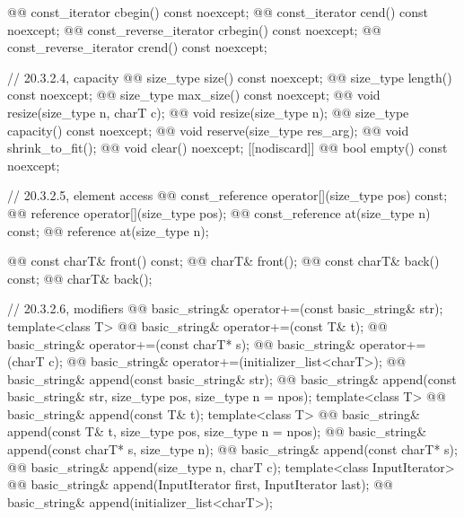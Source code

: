 \documentclass{wg21}
\begin{document}
\begin{codeblock}
{{    @@ const_iterator         cbegin() const noexcept;
    @@ const_iterator         cend() const noexcept;
    @@ const_reverse_iterator crbegin() const noexcept;
    @@ const_reverse_iterator crend() const noexcept;

    // 20.3.2.4, capacity
    @@ size_type size() const noexcept;
    @@ size_type length() const noexcept;
    @@ size_type max_size() const noexcept;
    @@ void resize(size_type n, charT c);
    @@ void resize(size_type n);
    @@ size_type capacity() const noexcept;
    @@ void reserve(size_type res_arg);
    @@ void shrink_to_fit();
    @@ void clear() noexcept;
    [[nodiscard]] @@ bool empty() const noexcept;

    // 20.3.2.5, element access
    @@ const_reference operator[](size_type pos) const;
    @@ reference       operator[](size_type pos);
    @@ const_reference at(size_type n) const;
    @@ reference       at(size_type n);

    @@ const charT& front() const;
    @@ charT&       front();
    @@ const charT& back() const;
    @@ charT&       back();

    // 20.3.2.6, modifiers
    @@ basic_string& operator+=(const basic_string& str);
    template<class T>
      @@ basic_string& operator+=(const T& t);
    @@ basic_string& operator+=(const charT* s);
    @@ basic_string& operator+=(charT c);
    @@ basic_string& operator+=(initializer_list<charT>);
    @@ basic_string& append(const basic_string& str);
    @@ basic_string& append(const basic_string& str, size_type pos, size_type n = npos);
    template<class T>
      @@ basic_string& append(const T& t);
    template<class T>
      @@ basic_string& append(const T& t, size_type pos, size_type n = npos);
    @@ basic_string& append(const charT* s, size_type n);
    @@ basic_string& append(const charT* s);
    @@ basic_string& append(size_type n, charT c);
    template<class InputIterator>
      @@ basic_string& append(InputIterator first, InputIterator last);
    @@ basic_string& append(initializer_list<charT>);

}}
\end{codeblock}
\end{document}
